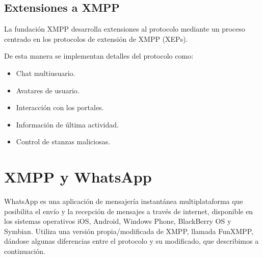\documentclass[a4paper, 11pt]{article} %
\begin{document}
  \subsection{Extensiones a XMPP}
    La fundación XMPP desarrolla extensiones al protocolo mediante un proceso
    centrado en los protocolos de extensión de XMPP (XEPs).
    
    De esta manera se implementan detalles del protocolo como:
    \begin{itemize}
     \item Chat multiusuario.
     \item Avatares de usuario.
     \item Interacción con los portales.
     \item Información de última actividad.
     \item Control de stanzas maliciosas.
    \end{itemize}

\section{XMPP y WhatsApp}
WhatsApp es una aplicación de mensajería instantánea multiplataforma que posibilita el envío y la recepción de mensajes a 
través de internet, disponible en los sistemas operativos iOS, Android, Windows Phone, BlackBerry OS y Symbian. Utiliza una
versión propia/modificada de XMPP, llamada FunXMPP, dándose algunas diferencias entre el protocolo y su modificado, que
describimos a continuación.
\end{document}
